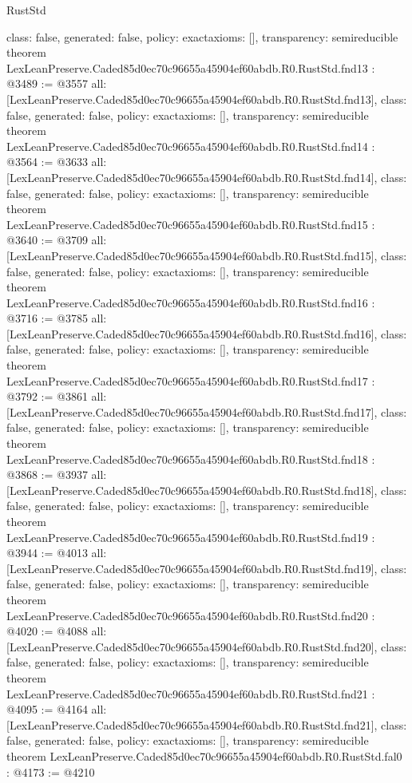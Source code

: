 \begin{lexlean}{RustStd}
\begin{coremodule}
{  class: false,
  generated: false,
  policy: exact{axioms: []},
  transparency: semireducible
}
theorem LexLeanPreserve.Caded85d0ec70c96655a45904ef60abdb.R0.RustStd.fnd13 : @3489 := @3557 {
  all: [LexLeanPreserve.Caded85d0ec70c96655a45904ef60abdb.R0.RustStd.fnd13],
  class: false,
  generated: false,
  policy: exact{axioms: []},
  transparency: semireducible
}
theorem LexLeanPreserve.Caded85d0ec70c96655a45904ef60abdb.R0.RustStd.fnd14 : @3564 := @3633 {
  all: [LexLeanPreserve.Caded85d0ec70c96655a45904ef60abdb.R0.RustStd.fnd14],
  class: false,
  generated: false,
  policy: exact{axioms: []},
  transparency: semireducible
}
theorem LexLeanPreserve.Caded85d0ec70c96655a45904ef60abdb.R0.RustStd.fnd15 : @3640 := @3709 {
  all: [LexLeanPreserve.Caded85d0ec70c96655a45904ef60abdb.R0.RustStd.fnd15],
  class: false,
  generated: false,
  policy: exact{axioms: []},
  transparency: semireducible
}
theorem LexLeanPreserve.Caded85d0ec70c96655a45904ef60abdb.R0.RustStd.fnd16 : @3716 := @3785 {
  all: [LexLeanPreserve.Caded85d0ec70c96655a45904ef60abdb.R0.RustStd.fnd16],
  class: false,
  generated: false,
  policy: exact{axioms: []},
  transparency: semireducible
}
theorem LexLeanPreserve.Caded85d0ec70c96655a45904ef60abdb.R0.RustStd.fnd17 : @3792 := @3861 {
  all: [LexLeanPreserve.Caded85d0ec70c96655a45904ef60abdb.R0.RustStd.fnd17],
  class: false,
  generated: false,
  policy: exact{axioms: []},
  transparency: semireducible
}
theorem LexLeanPreserve.Caded85d0ec70c96655a45904ef60abdb.R0.RustStd.fnd18 : @3868 := @3937 {
  all: [LexLeanPreserve.Caded85d0ec70c96655a45904ef60abdb.R0.RustStd.fnd18],
  class: false,
  generated: false,
  policy: exact{axioms: []},
  transparency: semireducible
}
theorem LexLeanPreserve.Caded85d0ec70c96655a45904ef60abdb.R0.RustStd.fnd19 : @3944 := @4013 {
  all: [LexLeanPreserve.Caded85d0ec70c96655a45904ef60abdb.R0.RustStd.fnd19],
  class: false,
  generated: false,
  policy: exact{axioms: []},
  transparency: semireducible
}
theorem LexLeanPreserve.Caded85d0ec70c96655a45904ef60abdb.R0.RustStd.fnd20 : @4020 := @4088 {
  all: [LexLeanPreserve.Caded85d0ec70c96655a45904ef60abdb.R0.RustStd.fnd20],
  class: false,
  generated: false,
  policy: exact{axioms: []},
  transparency: semireducible
}
theorem LexLeanPreserve.Caded85d0ec70c96655a45904ef60abdb.R0.RustStd.fnd21 : @4095 := @4164 {
  all: [LexLeanPreserve.Caded85d0ec70c96655a45904ef60abdb.R0.RustStd.fnd21],
  class: false,
  generated: false,
  policy: exact{axioms: []},
  transparency: semireducible
}
theorem LexLeanPreserve.Caded85d0ec70c96655a45904ef60abdb.R0.RustStd.fal0 : @4173 := @4210 {
}
\end{coremodule}
\end{lexlean}
